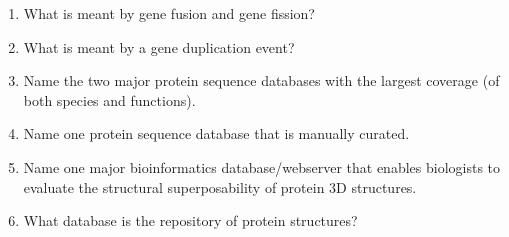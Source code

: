 \documentclass[11pt]{article}
\begin{document}
\begin{enumerate}
\item What is meant by gene fusion and gene fission?
\item What is meant by a gene duplication event?
\item Name the two major protein sequence databases with the largest coverage (of both species and functions).
\item Name one protein sequence database that is manually curated.
\item Name one major bioinformatics database/webserver that enables biologists to evaluate the structural superposability of protein 3D structures.
\item What database is the repository of protein structures?

\end{enumerate}
\end{document}
